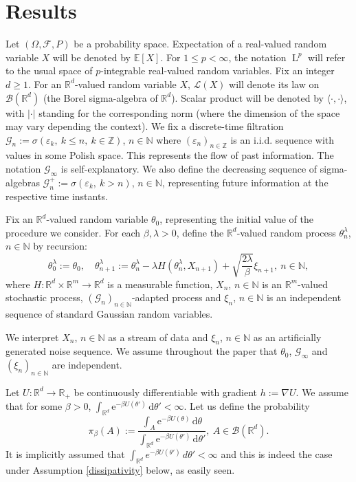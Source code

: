\documentclass[a4paper,draft]{article}
\def\PE{\mathbb{E}}
\def\lp{\operatorname{L}^p}
\def\rme{\mathrm{e}}
\def\rmd{\mathrm{d}}
\begin{document}
\section{Results}

Let $(\Omega,\mathcal{F},P)$ be a probability space. Expectation of a real-valued random
variable $X$ will be denoted by $\PE[X]$.
For $1\leq p<\infty$, the notation $\lp$ will refer to the usual space of $p$-integrable real-valued random variables.
Fix an integer $d\geq 1$. For an $\mathbb{R}^d$-valued random variable $X$,
$\mathcal{L}(X)$ will denote its law on $\mathcal{B}(\mathbb{R}^d)$ (the Borel sigma-algebra of $\mathbb{R}^d$). Scalar product will be denoted
by $\langle \cdot,\cdot\rangle$, with $|\cdot|$ standing for the
corresponding norm (where the dimension of the space may vary depending the context).
We fix a discrete-time filtration $\mathcal{G}_n:=\sigma(\varepsilon_k,\ k\leq n,\ k\in\mathbb{Z})$,
$n\in\mathbb{N}$
where $(\varepsilon_n)_{n\in\mathbb{Z}}$ is an i.i.d. sequence with values in some Polish space. This represents
the flow of past information. The notation $\mathcal{G}_{\infty}$ is self-explanatory.
We also define the decreasing sequence of sigma-algebras
$\mathcal{G}^+_n:=\sigma(\varepsilon_k,\ k>n)$, $n\in\mathbb{N}$, representing future information
at the respective time instants.

Fix an $\mathbb{R}^d$-valued random variable $\theta_0$, representing the initial value of
the procedure we consider.
For each $\beta,\lambda>0$, define the $\mathbb{R}^d$-valued
random process $\theta^{\lambda}_n$, $n\in\mathbb{N}$ by recursion:
\begin{equation}\label{nab}
\theta^{\lambda}_0:=\theta_0,\quad \theta^{\lambda}_{n+1}:=\theta^{\lambda}_n-\lambda H(\theta^{\lambda}_n,X_{n+1})+\sqrt{\frac{2\lambda}{\beta}}\xi_{n+1},\ n\in\mathbb{N},
\end{equation}
where $H:\mathbb{R}^d\times\mathbb{R}^m\to\mathbb{R}^d$ is a measurable
function, $X_n$, $n\in\mathbb{N}$ is an $\mathbb{R}^m$-valued stochastic process, $(\mathcal{G}_n)_{n\in\mathbb{N}}$-adapted
process and $\xi_n$, $n\in\mathbb{N}$ is
an independent sequence of standard Gaussian random variables.

We interpret $X_n$, $n\in\mathbb{N}$ as a stream of data and $\xi_n$, $n\in\mathbb{N}$ as an artificially
generated noise sequence.
We assume throughout the paper that $\theta_0$, $\mathcal{G}_{\infty}$ and $(\xi_{n})_{n\in\mathbb{N}}$
are independent.

Let $U:\mathbb{R}^d\to\mathbb{R}_+$ be continuously differentiable
with gradient $h:=\nabla U$. We assume that for some $\beta > 0$, 
$\int_{\mathbb{R}^d} \rme^{-\beta U(\theta')}\,\rmd \theta' <\infty$. Let us define the probability
\[
\pi_{\beta}(A):=\frac{\int_A \rme^{-\beta U(\theta)}\, \rmd \theta}{\int_{\mathbb{R}^d} \rme^{-\beta U(\theta')}\, \rmd \theta'},\
A\in\mathcal{B}(\mathbb{R}^d).
\]
It is implicitly assumed that $\int_{\mathbb{R}^d} e^{-\beta U(\theta')}\, d\theta'<\infty$ and this is
indeed the case under Assumption \ref{dissipativity} below, as easily seen.
\end{document}

